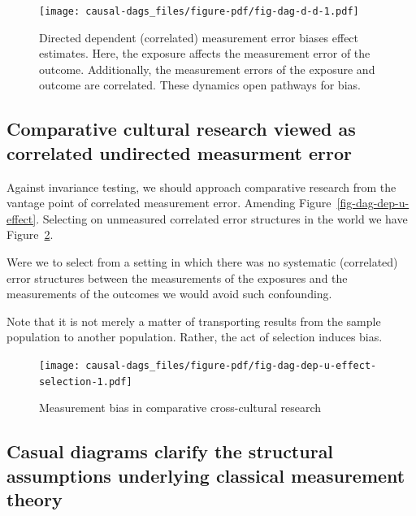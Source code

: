 \documentclass[
  singlecolumn]{report}
\begin{document}
\begin{figure}

{\centering \texttt{[image: causal-dags\_files/figure-pdf/fig-dag-d-d-1.pdf]}

}

\caption{\label{fig-dag-d-d}Directed dependent (correlated) measurement
error biases effect estimates. Here, the exposure affects the
measurement error of the outcome. Additionally, the measurement errors
of the exposure and outcome are correlated. These dynamics open pathways
for bias.}

\end{figure}

\hypertarget{comparative-cultural-research-viewed-as-correlated-undirected-measurment-error}{%
\subsection{Comparative cultural research viewed as correlated
undirected measurment
error}\label{comparative-cultural-research-viewed-as-correlated-undirected-measurment-error}}

Against invariance testing, we should approach comparative research from
the vantage point of correlated measurement error. Amending
Figure~\ref{fig-dag-dep-u-effect}. Selecting on unmeasured correlated
error structures in the world we have
Figure~\ref{fig-dag-dep-u-effect-selection}.

Were we to select from a setting in which there was no systematic
(correlated) error structures between the measurements of the exposures
and the measurements of the outcomes we would avoid such confounding.

Note that it is not merely a matter of transporting results from the
sample population to another population. Rather, the act of selection
induces bias.

\begin{figure}

{\centering \texttt{[image: causal-dags\_files/figure-pdf/fig-dag-dep-u-effect-selection-1.pdf]}

}

\caption{\label{fig-dag-dep-u-effect-selection}Measurement bias in
comparative cross-cultural research}

\end{figure}

\hypertarget{casual-diagrams-clarify-the-structural-assumptions-underlying-classical-measurement-theory}{%
\subsection{Casual diagrams clarify the structural assumptions
underlying classical measurement
theory}\label{casual-diagrams-clarify-the-structural-assumptions-underlying-classical-measurement-theory}}
\end{document}
